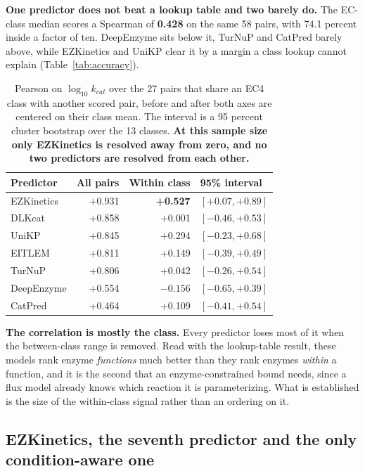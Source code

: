\textbf{One predictor does not beat a lookup table and two barely do.} The EC-class median
scores a Spearman of \textbf{0.428} on the same 58 pairs, with 74.1 percent inside a factor
of ten. DeepEnzyme sits below it, TurNuP and CatPred barely above, while EZKinetics and
UniKP clear it by a margin a class lookup cannot explain (Table~\ref{tab:accuracy}).

\begin{table}[!htbp]
  \centering
  \footnotesize
  \caption[Correlation before and after removing the class]{Pearson on $\log_{10} k_{cat}$
  over the 27 pairs that share an EC4 class with another scored pair, before and after both
  axes are centered on their class mean. The interval is a 95 percent cluster bootstrap over
  the 13 classes. \textbf{At this sample size only EZKinetics is resolved away from zero,
  and no two predictors are resolved from each other.}}
  \label{tab:within-class}
  \begin{tabular}{@{}lrrl@{}}
    \hline
    Predictor & All pairs & Within class & 95\% interval \\
    \hline
    EZKinetics & +0.931 & \textbf{+0.527} & $[+0.07, +0.89]$ \\
    DLKcat & +0.858 & +0.001 & $[-0.46, +0.53]$ \\
    UniKP & +0.845 & +0.294 & $[-0.23, +0.68]$ \\
    EITLEM & +0.811 & +0.149 & $[-0.39, +0.49]$ \\
    TurNuP & +0.806 & +0.042 & $[-0.26, +0.54]$ \\
    DeepEnzyme & +0.554 & $-0.156$ & $[-0.65, +0.39]$ \\
    CatPred & +0.464 & +0.109 & $[-0.41, +0.54]$ \\
    \hline
  \end{tabular}
\end{table}

\textbf{The correlation is mostly the class.} Every predictor loses most of it when the
between-class range is removed. Read with the lookup-table result, these models rank enzyme \emph{functions} much better
than they rank enzymes \emph{within} a function, and it is the second that an
enzyme-constrained bound needs, since a flux model already knows which reaction it is
parameterizing. What is established is the size of the within-class signal rather than an ordering on it.

\subsection{EZKinetics, the seventh predictor and the only condition-aware one}


